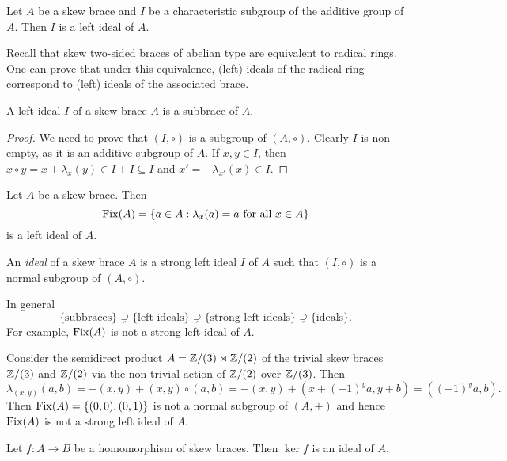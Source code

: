 \begin{example}
    Let $A$ be a skew brace and $I$ be a characteristic subgroup 
    of the additive group of $A$. Then 
    $I$ is a left ideal of $A$. 
\end{example}

Recall that skew two-sided braces of abelian type 
are equivalent to radical rings. 
One can prove that under this equivalence, 
(left) ideals of the radical ring correspond 
to (left) ideals of the associated brace. 

\begin{proposition}
    A left ideal $I$ of a skew brace $A$ is a subbrace of $A$. 
\end{proposition}

\begin{proof}
    We need to prove that $(I,\circ)$ is a subgroup of $(A,\circ)$. Clearly $I$ is non-empty, 
    as it is an additive subgroup of $A$. If $x,y\in I$, then
    $x\circ y=x+\lambda_x(y)\in I+I\subseteq I$ and $x'=-\lambda_{x'}(x)\in I$. 
\end{proof}

\begin{example}
    Let $A$ be a skew brace. Then 
    \[
    \operatorname{Fix}(A)=\{a\in A:\lambda_x(a)=a\text{ for all $x\in A$}\}
    \]
    is a left ideal of $A$. 
\end{example}

\begin{definition}
    An \emph{ideal} of a skew brace $A$ is a strong left ideal $I$ of $A$ such that 
	$(I,\circ)$ is a normal subgroup of $(A,\circ)$. 
\end{definition}

In general 
\[
\{\text{subbraces}\}\supsetneq \{\text{left ideals}\}\supsetneq\{\text{strong left ideals}\}\supsetneq\{\text{ideals}\}.
\]
For example, $\operatorname{Fix}(A)$ is not a strong left ideal of $A$.

\begin{example}
    Consider the semidirect product $A=\mathbb{Z}/(3)\rtimes \mathbb{Z}/(2)$ of the
    trivial skew braces $\mathbb{Z}/(3)$ and $\mathbb{Z}/(2)$
    via the non-trivial action of $\mathbb{Z}/(2)$ over $\mathbb{Z}/(3)$.
    Then 
    \[
    \lambda_{(x,y)}(a,b)=-(x,y)+(x,y)\circ(a,b)=-(x,y)+(x+(-1)^ya,y+b)=((-1)^ya,b).
    \]
    Then $\operatorname{Fix}(A)=\{(0,0),(0,1)\}$ is not a 
    normal subgroup of $(A,+)$ and hence $\operatorname{Fix}(A)$ is not a strong left 
    ideal of $A$.
\end{example}

\begin{example}
	Let $f\colon A\to B$ be a homomorphism of skew braces. Then $\ker f$ 
	is an ideal of $A$.
\end{example}

